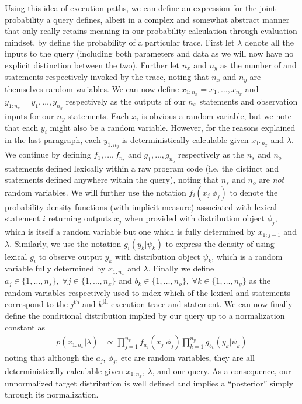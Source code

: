 Using this idea of execution paths, we can define an expression for the joint probability a query defines,
albeit in a complex and somewhat abstract manner that only really retains meaning in our probability calculation through
evaluation mindset, by define the probability of a particular trace.  First let $\lambda$ denote all the 
inputs to the query (including both parameters and
data as we will now have no explicit distinction between the two).  Further let
$n_x$ and $n_y$ as the number of \sample and \observe statements
respectively invoked by the trace, noting that $n_x$ and $n_y$ are themselves random variables.
We can now define $x_{1:n_x} = x_1,\dots,x_{n_x}$ and $y_{1:n_y} = y_1,\dots,y_{n_y}$ respectively as the
outputs of our $n_x$ \sample statements and observation inputs for our $n_y$ \observe statements.
Each $x_{i}$ is obvious a random variable, but we note that each $y_i$ might also be a random variable.  However,
for the reasons explained in the last paragraph, each $y_{1:n_y}$ is deterministically calculable given $x_{1:n_x}$ and
$\lambda$.
We continue by defining $f_{1},\dots,f_{n_s}$ and $g_{1},\dots,g_{n_o}$ respectively as the $n_s$ \sample 
and $n_o$ \observe statements defined lexically within a raw program code (i.e. the distinct \sample and \observe
statements defined anywhere within the query), noting that $n_s$ and $n_o$ are \emph{not} random variables.
We will further use the notation $f_i(x_j|\phi_j)$  to denote the probability density functions
(with implicit measure) associated with lexical \sample statement $i$ returning outputs $x_j$ when provided
with distribution object $\phi_j$, which is itself a random variable but one which is fully determined by
$x_{1:j-1}$ and $\lambda$.  Similarly, we use the notation $g_i(y_k|\psi_k)$ to express the density of
using lexical \observe $g_i$ to observe output $y_k$ with distribution object $\psi_k$, which is a random
variable fully determined by $x_{1:n_x}$ and $\lambda$.  Finally we define $a_j \in \{1,\dots,n_s\}, \; 
\forall j\in\{1,\dots,n_x\}$ and $b_k \in \{1,\dots,n_o\}, \; \forall k\in\{1,\dots,n_y\}$ as the
random variables respectively used to index which of the lexical \sample and \observe statements
correspond to the $j^{\text{th}}$ and $k^{\text{th}}$ execution trace \sample and \observe statement.
We can now finally define the conditional distribution implied by our query up to a normalization constant
as
\begin{align}
\label{eq:probprog:universal-cond}
p(x_{1:n_x} | \lambda)
&\propto
\prod_{j=1}^{n_x} 
f_{a_j}(x_j | \phi_j)
\prod_{k=1}^{n_y}
g_{b_k}(y_k | \psi_k)
\end{align}
noting that although the $a_j$, $\phi_j$, etc are random variables, they are all deterministically
calculable given $x_{1:n_x}$, $\lambda$, and our query.  As a consequence, our unnormalized
target distribution is well defined and implies a ``posterior'' simply through its normalization.

